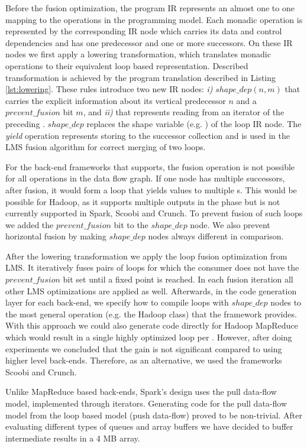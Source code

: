 Before the fusion optimization, the program IR represents an almost one to one mapping to the operations in the programming model. Each monadic operation is represented by the corresponding IR node which carries its data and control dependencies and has one predecessor and one or more successors. On these IR nodes we first apply a lowering transformation, which translates monadic operations to their equivalent loop based representation. Described transformation is achieved by the program translation described in Listing \ref{lst:lowering}. These rules introduce two new IR nodes: \emph{i)} $shape\_dep(n, m)$ that carries the explicit information about its vertical predecessor $n$ and a $prevent\_fusion$ bit $m$, and \emph{ii)}  that represents reading from an iterator of the preceding . $shape\_dep$ replaces the shape variable (e.g. ) of the loop IR node. The \emph{yield} operation represents storing to the successor collection and is used in the LMS fusion algorithm for correct merging of two loops.

For the back-end frameworks that \tool supports, the fusion operation is not possible for all operations in the data flow graph. If one node has multiple successors, after fusion, it would form a loop that yields values to multiple s. This would be possible for Hadoop, as it supports multiple outputs in the  phase but is not currently supported in Spark, Scoobi and Crunch. To prevent fusion of such loops we added the $prevent\_fusion$ bit to the $shape\_dep$ node. We also prevent horizontal fusion by making $shape\_dep$ nodes always different in comparison.  

After the lowering transformation we apply the loop fusion optimization from LMS. It iteratively fuses pairs of loops for which the consumer does not have the $prevent\_fusion$ bit set until a fixed point is reached. In each fusion iteration all other LMS optimizations are applied as well. Afterwards, in the code generation layer for each back-end, we specify how to compile loops with $shape\_dep$ nodes to the most general operation (e.g. the Hadoop  class) that the framework provides. With this approach we could also generate code directly for Hadoop MapReduce which would result in a single highly optimized loop per . However, after doing experiments we concluded that the gain is not significant compared to using higher level back-ends. Therefore, as an alternative, we used the frameworks Scoobi and Crunch.

Unlike MapReduce based back-ends, Spark's design uses the pull data-flow model, implemented through iterators. Generating code for the pull data-flow model from the loop based model (push data-flow) proved to be non-trivial. After evaluating different types of queues and array buffers we have decided to buffer intermediate results in a 4 MB array.